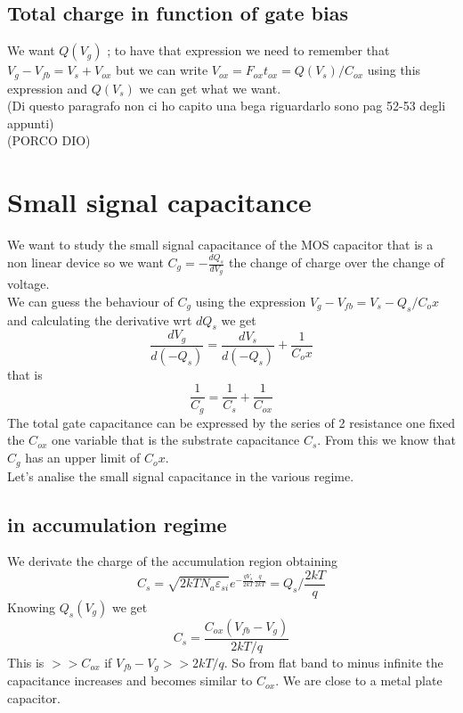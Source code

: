 \subsection{Total charge in function of gate bias}
We want $Q(V_g)$ ; to have that expression we need to remember that $V_g-V_{fb}=V_s+V_{ox}$ but we can write $V_{ox}=F_{ox}t_{ox}=Q(V_s)/C_{ox}$ using this expression and $Q(V_s)$ we can get what we want.\\
(Di questo paragrafo non ci ho capito una bega riguardarlo sono pag 52-53 degli appunti)\\
\centering
(PORCO DIO)\\
\raggedright


\section{Small signal capacitance}
We want to study the small signal capacitance of the MOS capacitor that is a non linear device so we want $C_g=-\frac{dQ_s}{dV_g}$ the change of charge over the change of voltage.\\
We can guess the behaviour of $C_g$ using the expression $V_g-V_{fb}=V_s-Q_s/C_ox$ and calculating the derivative wrt $dQ_s$ we get
\begin{equation}
\frac{dV_g}{d(-Q_s)}=\frac{dV_s}{d(-Q_s)}+\frac{1}{C_ox}
\end{equation}
that is 
\begin{equation}
\frac{1}{C_g}=\frac{1}{C_s}+\frac{1}{C_{ox}}
\end{equation}
The total gate capacitance can be expressed by the series of 2 resistance one fixed the $C_{ox}$ one variable that is the substrate capacitance $C_s$. From this we know that $C_g$ has an upper limit of $C_ox$.\\
Let's analise the small signal capacitance in the various regime.\\

\subsection{in accumulation regime}
We derivate the charge of the accumulation region obtaining 
\begin{equation}
C_s=\sqrt{2kTN_a\varepsilon_{si}}e^{-\frac{qV_s}{2kT}\frac{q}{2kT}}=Q_s/\frac{2kT}{q}
\end{equation}
Knowing $Q_s(V_g)$ we get 
\begin{equation}
C_s=\frac{C_{ox}(V_{fb}-V_g)}{2kT/q}
\end{equation}
This is $>>C_{ox}$ if $V_{fb}-V_g>>2kT/q$. So from flat band to minus infinite the capacitance increases and becomes similar to $C_{ox}$. We are close to a metal plate capacitor.\\

